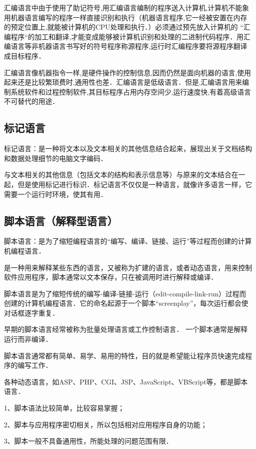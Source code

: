 汇编语言中由于使用了助记符号,用汇编语言编制的程序送入计算机,计算机不能象用机器语言编写的程序一样直接识别和执行（机器语言程序,它一经被安置在内存的预定位置上,就能被计算机的CPU处理和执行．）必须通过预先放入计算机的 “汇编程序“的加工和翻译,才能变成能够被计算机识别和处理的二进制代码程序．用汇编语言等非机器语言书写好的符号程序称源程序,运行时汇编程序要将源程序翻译成目标程序．

汇编语言像机器指令一样,是硬件操作的控制信息,因而仍然是面向机器的语言,使用起来还是比较繁琐费时,通用性也差．汇编语言是低级语言．但是,汇编语言用来编制系统软件和过程控制软件,其目标程序占用内存空间少,运行速度快,有着高级语言不可替代的用途．

\subsection{标记语言}\label{CpLgg_sub3}

标记语言：是一种将文本以及文本相关的其他信息结合起来，展现出关于文档结构和数据处理细节的电脑文字编码．

与文本相关的其他信息（包括文本的结构和表示信息等）与原来的文本结合在一起，但是使用标记进行标识．标记语言不仅仅是一种语言，就像许多语言一样，它需要一个运行时环境，使其有用．

\subsection{脚本语言（解释型语言）}\label{CpLgg_sub4}

脚本语言：是为了缩短编程语言的“编写、编译、链接、运行”等过程而创建的计算机编程语言．

是一种用来解释某些东西的语言，又被称为扩建的语言，或者动态语言，用来控制软件应用程序，脚本通常以文本保存，只在被调用时进行解释或编译．

脚本语言是为了缩短传统的编写-编译-链接-运行（edit-compile-link-run）过程而创建的计算机编程语言．它的命名起源于一个脚本“screenplay”，每次运行都会使对话框逐字重复．

早期的脚本语言经常被称为批量处理语言或工作控制语言． 一个脚本通常是解释运行而非编译．

脚本语言通常都有简单、易学、易用的特性，目的就是希望能让程序员快速完成程序的编写工作．

各种动态语言，如ASP、PHP、CGI、JSP、JavaScript、VBScript等，都是脚本语言．

1、脚本语法比较简单，比较容易掌握；

2、脚本与应用程序密切相关，所以包括相对应用程序自身的功能；

3、脚本一般不具备通用性，所能处理的问题范围有限．

